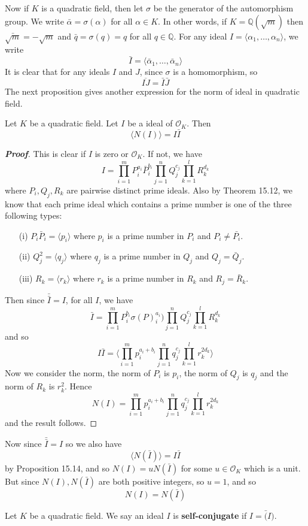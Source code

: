 Now if $K$ is a quadratic field, then let $\sigma$ be the generator of the automorphism group. We write
$\bar{\alpha}=\sigma(\alpha)$ for all $\alpha \in K$. In other words, if
$K=\mathbb{Q}(\sqrt{m})$ then $\bar{\sqrt{m}}=-\sqrt{m}$ and $\bar{q}=\sigma(q)=q$ for all $q \in \mathbb{Q}$.
For any ideal $I=\langle \alpha_1,\ldots,\alpha_n \rangle$, we write
$$\bar{I}=\langle \bar{\alpha}_1,\ldots,\bar{\alpha}_n \rangle$$
It is clear that for any ideals $I$ and $J$, since $\sigma$ is a homomorphism, so
$$\overline{IJ}=\bar{I}\bar{J}$$
The next proposition gives another expression for the norm of ideal in quadratic field.
\begin{proposition} Let $K$ be a quadratic field. Let $I$ be a ideal of $\mathcal{O}_K$. Then
$$\langle N(I) \rangle=I \bar{I}$$
\end{proposition}
\begin{proof}[\bf Proof] This is clear if $I$ is zero or $\mathcal{O}_K$. If not, we have
$$I=\prod_{i=1}^m P^{a_i}_i \bar{P}^{b_i}_i \prod_{j=1}^n Q^{c_j}_j  \prod_{k=1}^l R^{d_k}_k$$
where $P_i,Q_j,R_k$ are pairwise distinct prime ideals. Also by Theorem 15.12, we know that each prime ideal
which contains a prime number is one of the three following types:
\begin{enumerate}
\item[(i)] $P_i \bar{P}_i= \langle p_i \rangle$ where $p_i$ is a prime number in $P_i$ and $P_i \neq \bar{P_i}$.\\
\item[(ii)] $Q^2_j=\langle q_j \rangle$ where $q_j$ is a prime number in $Q_j$ and $Q_j=\bar{Q}_j$.\\
\item[(iii)] $R_k=\langle r_k \rangle$ where $r_k$ is a prime number in $R_k$ and $R_j=\bar{R}_k$.
\end{enumerate}
Then since $\bar{\bar{I}}=I$, for all $I$, we have
$$\bar{I}=\prod_{i=1}^m P^{b_i}_i\sigma(P)^{a_i}_i) \prod_{j=1}^n Q^{c_j}_j \prod_{k=1}^l R^{d_k}_k$$
and so
$$I\bar{I}=\langle \prod_{i=1}^m p^{a_i+b_i}_i \prod_{j=1}^n q^{c_j}_j \prod_{k=1}^l r^{2d_k}_k\rangle$$
Now we consider the norm, the norm of $P_i$ is $p_i$, the norm of $Q_j$ is $q_j$ and the norm of
$R_k$ is $r^2_k$. Hence
$$N(I)=\prod_{i=1}^m p^{a_i+b_i}_i \prod_{j=1}^n q^{c_j}_j \prod_{k=1}^l r^{2d_k}_k$$
and the result follows.
\end{proof}
Now since $\bar{\bar{I}}=I$ so we also have
$$\langle N(\bar{I}) \rangle=I\bar{I}$$
by Proposition 15.14, and so $N(I)=uN(\bar{I})$ for some $u \in \mathcal{O}_K$ which is a unit. But
since $N(I),N(\bar{I})$ are both positive integers, so $u=1$, and so
$$N(I)=N(\bar{I})$$
\begin{definition} Let $K$ be a quadratic field. We say an ideal $I$ is {\bf self-conjugate} if $I=\bar(I)$.
\end{definition}



